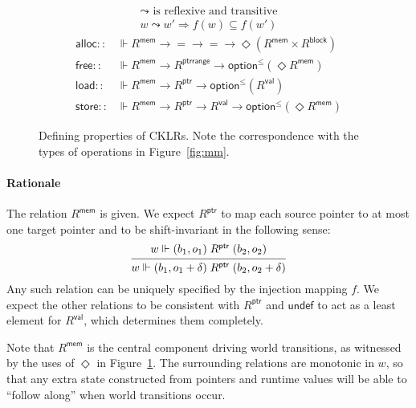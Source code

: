 \documentclass[11pt,oneside,draft]{book}
\theoremstyle{definition}
\newcommand{\kw}[1]{\ensuremath{ \mathsf{#1} }}
\begin{document}
\begin{figure} %
  \begin{gather*}
    {\leadsto} \mbox{ is reflexive and transitive} \\
    w \leadsto w' \Rightarrow f(w) \subseteq f(w')
  \end{gather*}
  \begin{align*}
      \kw{alloc} ::
        &\Vdash R^\kw{mem} \rightarrow {=} \rightarrow {=} \rightarrow
        \Diamond (R^\kw{mem} \times R^\kw{block})
      \\
      \kw{free} ::
        &\Vdash R^\kw{mem} \rightarrow R^\kw{ptrrange} \rightarrow
        \kw{option}^\le(\Diamond R^\kw{mem})
      \\
      \kw{load} ::
        &\Vdash R^\kw{mem} \rightarrow R^\kw{ptr} \rightarrow
        \kw{option}^\le(R^\kw{val})
      \\
      \kw{store} ::
        &\Vdash R^\kw{mem} \rightarrow R^\kw{ptr} \rightarrow R^\kw{val} \rightarrow
        \kw{option}^\le(\Diamond R^\kw{mem})
  \end{align*}
  \caption[Defining properties of CKLRs]%
   {Defining properties of CKLRs.
    Note the correspondence with
    the types of operations in Figure~\ref{fig:mm}.}
  \label{fig:cklr-def}
\end{figure}

\paragraph{Rationale} %

The relation $R^\kw{mem}$ is given.
We expect $R^\kw{ptr}$ to map
each source pointer to at most one target pointer
and to be shift-invariant in the following sense:
\[
  \begin{prooftree}
    \hypo{w \Vdash (b_1, o_1) \mathrel{R^\kw{ptr}} (b_2, o_2)}
    \infer1{
      w \Vdash (b_1, o_1 + \delta) \mathrel{R^\kw{ptr}} (b_2, o_2 + \delta)}
  \end{prooftree}
\]
Any such relation can be uniquely specified by
the injection mapping $f$.
We expect the other relations to be consistent with $R^\kw{ptr}$
and $\kw{undef}$ to act as a least element for $R^\kw{val}$,
which determines them completely.


Note that $R^\kw{mem}$
is the central component driving world transitions,
as witnessed by the uses of $\Diamond$ in Figure~\ref{fig:cklr-def}.
The surrounding relations are monotonic in $w$,
so that any extra state
constructed from pointers and runtime values
will be able to ``follow along'' when
world transitions occur.
\end{document}
